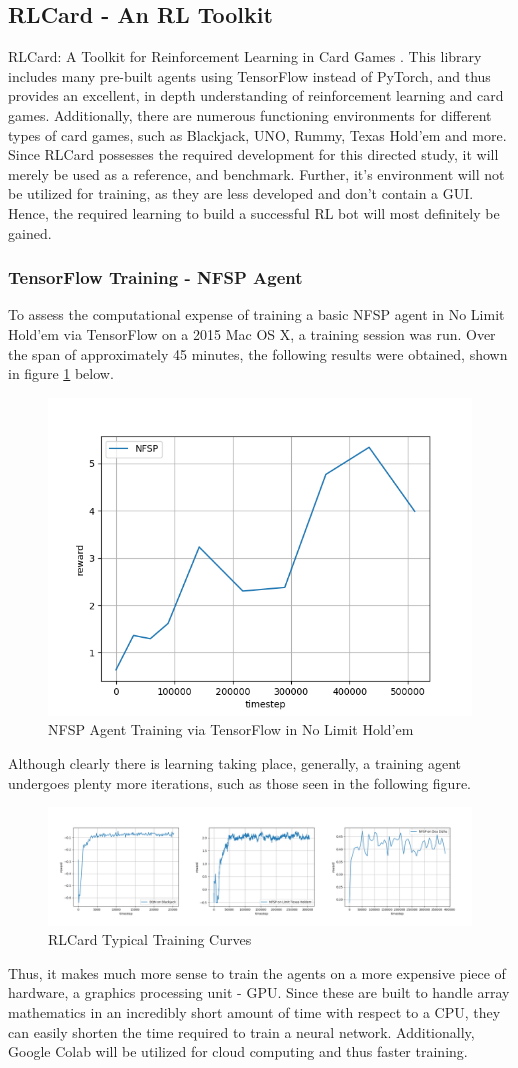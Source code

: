 \documentclass[12pt]{article}
\begin{document}
\subsection{RLCard - An RL Toolkit}
RLCard: A Toolkit for Reinforcement Learning in Card Games \cite{rlcard}. This library includes many pre-built agents using TensorFlow instead of PyTorch, and thus provides an excellent, in depth understanding of reinforcement learning and card games. Additionally, there are numerous functioning environments for different types of card games, such as Blackjack, UNO, Rummy, Texas Hold'em and more. Since RLCard possesses the required development for this directed study, it will merely be used as a reference, and benchmark. Further, it's environment will not be utilized for training, as they are less developed and don't contain a GUI. Hence, the required learning to build a successful RL bot will most definitely be gained.
\subsubsection{TensorFlow Training - NFSP Agent}
To assess the computational expense of training a basic NFSP agent in No Limit Hold'em via TensorFlow on a 2015 Mac OS X, a training session was run. Over the span of approximately 45 minutes, the following results were obtained, shown in figure \ref{fig:nfsptf} below.
\begin{figure}[H]
    \centering
    \includegraphics[width=.50\linewidth]{figures/tftrain.png}
    \caption{NFSP Agent Training via TensorFlow in No Limit Hold'em}
    \label{fig:nfsptf}
\end{figure}
Although clearly there is learning taking place, generally, a training agent undergoes plenty more iterations, such as those seen in the following figure.
\begin{figure}[H]
    \centering
    \includegraphics[width=.90\linewidth]{figures/curves.png}
    \caption{RLCard Typical Training Curves \cite{rlcard}}
    \label{fig:rlcurve}
\end{figure}
Thus, it makes much more sense to train the agents on a more expensive piece of hardware, a graphics processing unit - GPU. Since these are built to handle array mathematics in an incredibly short amount of time with respect to a CPU, they can easily shorten the time required to train a neural network. Additionally, Google Colab will be utilized for cloud computing and thus faster training.
\end{document}
